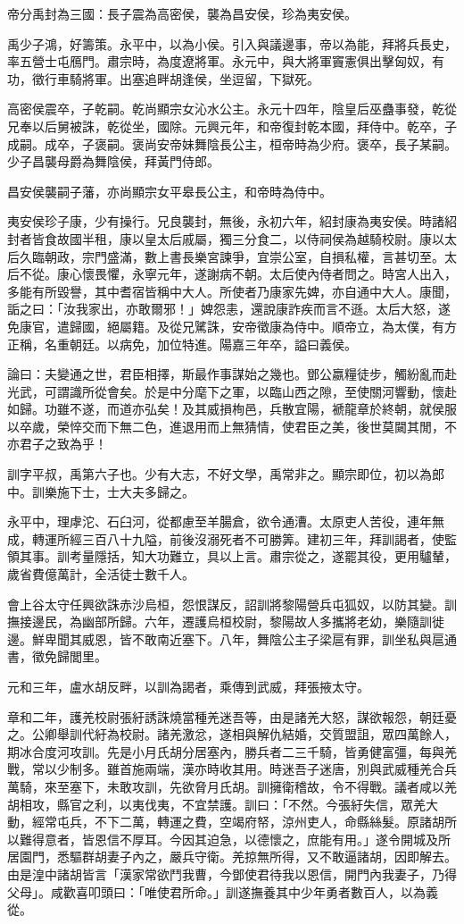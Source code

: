 \begin{pinyinscope}
帝分禹封為三國：長子震為高密侯，襲為昌安侯，珍為夷安侯。

禹少子鴻，好籌策。永平中，以為小侯。引入與議邊事，帝以為能，拜將兵長史，率五營士屯鴈門。肅宗時，為度遼將軍。永元中，與大將軍竇憲俱出擊匈奴，有功，徵行車騎將軍。出塞追畔胡逢侯，坐逗留，下獄死。

高密侯震卒，子乾嗣。乾尚顯宗女沁水公主。永元十四年，陰皇后巫蠱事發，乾從兄奉以后舅被誅，乾從坐，國除。元興元年，和帝復封乾本國，拜侍中。乾卒，子成嗣。成卒，子褒嗣。褒尚安帝妹舞陰長公主，桓帝時為少府。褒卒，長子某嗣。少子昌襲母爵為舞陰侯，拜黃門侍郎。

昌安侯襲嗣子藩，亦尚顯宗女平皋長公主，和帝時為侍中。

夷安侯珍子康，少有操行。兄良襲封，無後，永初六年，紹封康為夷安侯。時諸紹封者皆食故國半租，康以皇太后戚屬，獨三分食二，以侍祠侯為越騎校尉。康以太后久臨朝政，宗門盛滿，數上書長樂宮諫爭，宜崇公室，自損私權，言甚切至。太后不從。康心懷畏懼，永寧元年，遂謝病不朝。太后使內侍者問之。時宮人出入，多能有所毀譽，其中耆宿皆稱中大人。所使者乃康家先婢，亦自通中大人。康聞，詬之曰：「汝我家出，亦敢爾邪！」婢怨恚，還說康詐疾而言不遜。太后大怒，遂免康官，遣歸國，絕屬籍。及從兄騭誅，安帝徵康為侍中。順帝立，為太僕，有方正稱，名重朝廷。以病免，加位特進。陽嘉三年卒，謚曰義侯。

論曰：夫變通之世，君臣相擇，斯最作事謀始之幾也。鄧公嬴糧徒步，觸紛亂而赴光武，可謂識所從會矣。於是中分麾下之軍，以臨山西之隙，至使關河響動，懷赴如歸。功雖不遂，而道亦弘矣！及其威損栒邑，兵散宜陽，褫龍章於終朝，就侯服以卒歲，榮悴交而下無二色，進退用而上無猜情，使君臣之美，後世莫闚其閒，不亦君子之致為乎！

訓字平叔，禹第六子也。少有大志，不好文學，禹常非之。顯宗即位，初以為郎中。訓樂施下士，士大夫多歸之。

永平中，理虖沱、石臼河，從都慮至羊腸倉，欲令通漕。太原吏人苦役，連年無成，轉運所經三百八十九隘，前後沒溺死者不可勝筭。建初三年，拜訓謁者，使監領其事。訓考量隱括，知大功難立，具以上言。肅宗從之，遂罷其役，更用驢輦，歲省費億萬計，全活徒士數千人。

會上谷太守任興欲誅赤沙烏桓，怨恨謀反，詔訓將黎陽營兵屯狐奴，以防其變。訓撫接邊民，為幽部所歸。六年，遷護烏桓校尉，黎陽故人多攜將老幼，樂隨訓徙邊。鮮卑聞其威恩，皆不敢南近塞下。八年，舞陰公主子梁扈有罪，訓坐私與扈通書，徵免歸閭里。

元和三年，盧水胡反畔，以訓為謁者，乘傳到武威，拜張掖太守。

章和二年，護羌校尉張紆誘誅燒當種羌迷吾等，由是諸羌大怒，謀欲報怨，朝廷憂之。公卿舉訓代紆為校尉。諸羌激忿，遂相與解仇結婚，交質盟詛，眾四萬餘人，期冰合度河攻訓。先是小月氏胡分居塞內，勝兵者二三千騎，皆勇健富彊，每與羌戰，常以少制多。雖首施兩端，漢亦時收其用。時迷吾子迷唐，別與武威種羌合兵萬騎，來至塞下，未敢攻訓，先欲脅月氏胡。訓擁衛稽故，令不得戰。議者咸以羌胡相攻，縣官之利，以夷伐夷，不宜禁護。訓曰：「不然。今張紆失信，眾羌大動，經常屯兵，不下二萬，轉運之費，空竭府帑，涼州吏人，命縣絲髮。原諸胡所以難得意者，皆恩信不厚耳。今因其迫急，以德懷之，庶能有用。」遂令開城及所居園門，悉驅群胡妻子內之，嚴兵守衛。羌掠無所得，又不敢逼諸胡，因即解去。由是湟中諸胡皆言「漢家常欲鬥我曹，今鄧使君待我以恩信，開門內我妻子，乃得父母」。咸歡喜叩頭曰：「唯使君所命。」訓遂撫養其中少年勇者數百人，以為義從。


\end{pinyinscope}
